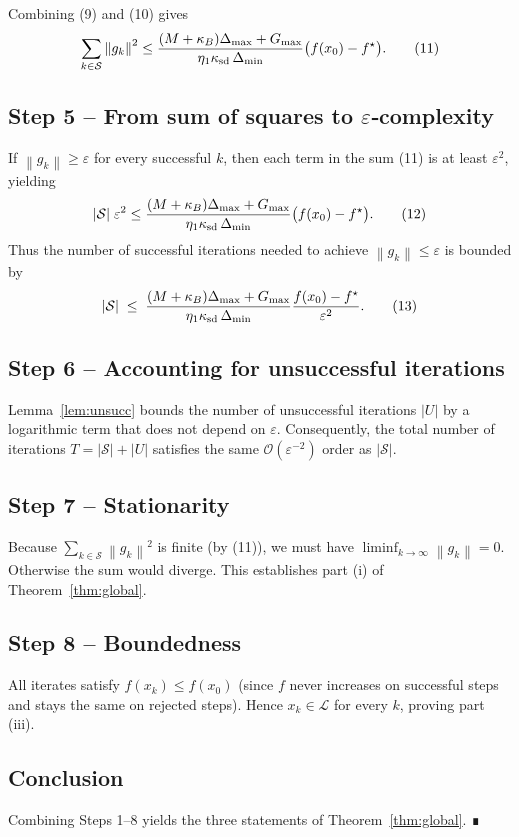 \documentclass[11pt]{article}
\newcommand{\norm}[1]{\left\lVert#1\right\rVert}
\begin{document}
Combining (9) and (10) gives
\[
\sum_{k\in\mathcal{S}}\norm{g_{k}}^{2}
\le
\frac{(M+\kappa_{B})\Delta_{\max}+G_{\max}}{\eta_{1}\kappa_{\rm sd}\,\Delta_{\min}}
\bigl(f(x_{0})-f^{\star}\bigr). \tag{11}
\]

\subsection*{Step 5 – From sum of squares to $\varepsilon$‑complexity}
If $\norm{g_{k}}\ge\varepsilon$ for every successful $k$, then each term in the sum (11) is at least $\varepsilon^{2}$, yielding
\[
|\mathcal{S}|\;\varepsilon^{2}
\le
\frac{(M+\kappa_{B})\Delta_{\max}+G_{\max}}{\eta_{1}\kappa_{\rm sd}\,\Delta_{\min}}
\bigl(f(x_{0})-f^{\star}\bigr). \tag{12}
\]
Thus the number of successful iterations needed to achieve $\norm{g_{k}}\le\varepsilon$ is bounded by
\[
|\mathcal{S}|\;\le\;
\frac{(M+\kappa_{B})\Delta_{\max}+G_{\max}}{\eta_{1}\kappa_{\rm sd}\,\Delta_{\min}}
\frac{f(x_{0})-f^{\star}}{\varepsilon^{2}}. \tag{13}
\]

\subsection*{Step 6 – Accounting for unsuccessful iterations}
Lemma~\ref{lem:unsucc} bounds the number of unsuccessful iterations $|U|$ by a logarithmic term that does not depend on $\varepsilon$. Consequently, the total number of iterations $T=|\mathcal{S}|+|U|$ satisfies the same $\mathcal{O}(\varepsilon^{-2})$ order as $|\mathcal{S}|$.

\subsection*{Step 7 – Stationarity}
Because $\sum_{k\in\mathcal{S}}\norm{g_{k}}^{2}$ is finite (by (11)), we must have $\liminf_{k\to\infty}\norm{g_{k}}=0$. Otherwise the sum would diverge. This establishes part (i) of Theorem~\ref{thm:global}.

\subsection*{Step 8 – Boundedness}
All iterates satisfy $f(x_{k})\le f(x_{0})$ (since $f$ never increases on successful steps and stays the same on rejected steps). Hence $x_{k}\in\mathcal{L}$ for every $k$, proving part (iii).

\subsection*{Conclusion}
Combining Steps 1–8 yields the three statements of Theorem~\ref{thm:global}. ∎
\end{document}
